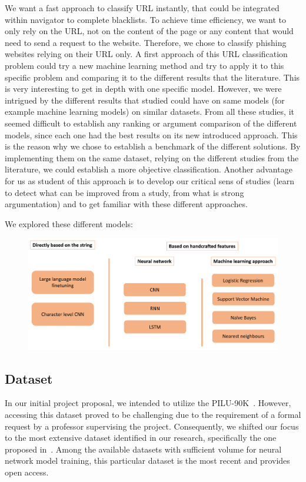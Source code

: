 \documentclass{article}
\begin{document}
    We want a fast approach to classify URL instantly, that could be integrated within navigator to complete blacklists.
    To achieve time efficiency, we want to only rely on the URL, not on the content of the page or any content that would need to send a request to the website.
    Therefore, we chose to classify phishing websites relying on their URL only.
    A first approach of this URL classification problem could try a new machine learning method and try to apply it to this specific problem and comparing it to the different results that the literature.
    This is very interesting to get in depth with one specific model.
    However, we were intrigued by the different results that studied could have on same models (for example machine learning models) on similar datasets.
    From all these studies, it seemed difficult to establish any ranking or argument comparison of the different models, since each one had the best results on its new introduced approach.
    This is the reason why we chose to establish a benchmark of the different solutions.
    By implementing them on the same dataset, relying on the different studies from the literature, we could establish a more objective classification.
    Another advantage for us as student of this approach is to develop our critical sens of studies (learn to detect what can be improved from a study, from what is strong argumentation) and to get familiar with these different approaches.

    We explored these different models:
    \begin{figure}[H]
        \centering
        \includegraphics[width=\linewidth]{report_img/modelspresentation}
        \caption{}
        \label{fig:model_presentation}
    \end{figure}

    \subsection{Dataset}\label{subsec:dataset}
    In our initial project proposal, we intended to utilize the PILU-90K~\cite{PhishingURLDetection}.
    However, accessing this dataset proved to be challenging due to the requirement of a formal request by a professor supervising the project.
    Consequently, we shifted our focus to the most extensive dataset identified in our research, specifically the one proposed in~\cite{VisualizingRNNInURLDetection}.
    Among the available datasets with sufficient volume for neural network model training, this particular dataset is the most recent and provides open access.
\end{document}
